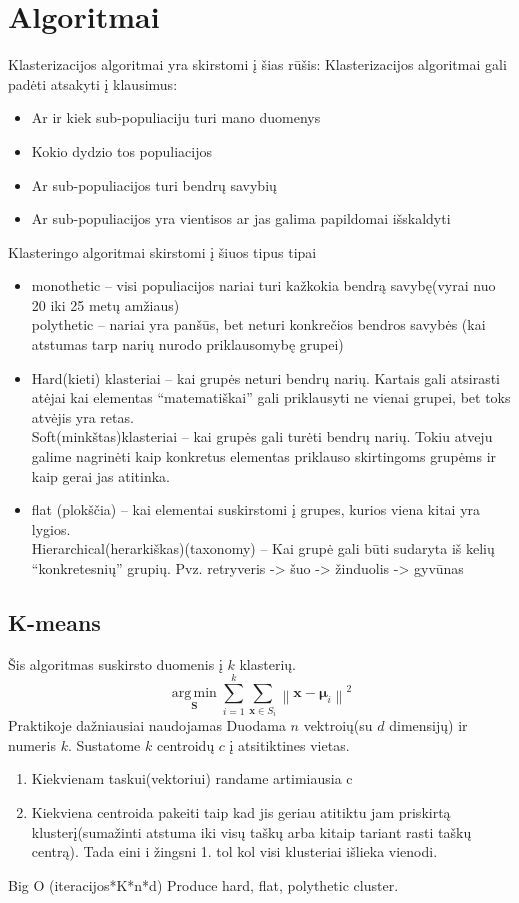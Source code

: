 \documentclass{VUMIFInfKursinis}
\begin{document}
\section{Algoritmai}
Klasterizacijos algoritmai yra skirstomi į šias rūšis:
Klasterizacijos algoritmai gali padėti atsakyti į klausimus:
\begin{itemize}
	\item Ar ir kiek sub-populiaciju turi mano duomenys
	\item Kokio dydzio tos populiacijos
	\item Ar sub-populiacijos turi bendrų savybių
	\item Ar sub-populiacijos yra vientisos ar jas galima papildomai išskaldyti
\end{itemize}
Klasteringo algoritmai skirstomi į šiuos tipus tipai
\begin{itemize}
	\item monothetic – visi populiacijos nariai turi kažkokia bendrą savybę(vyrai nuo 20 iki 25 metų amžiaus)
\\polythetic – nariai yra panšūs, bet neturi konkrečios bendros savybės (kai atstumas tarp narių nurodo priklausomybę grupei)
	\item Hard(kieti) klasteriai – kai grupės neturi bendrų narių. Kartais gali atsirasti atėjai kai elementas “matematiškai” gali priklausyti ne vienai grupei, bet toks atvėjis yra retas.
\\Soft(minkštas)klasteriai – kai grupės gali turėti bendrų narių. Tokiu atveju galime nagrinėti kaip konkretus elementas priklauso skirtingoms grupėms ir kaip gerai jas atitinka.
	\item flat (plokščia) – kai elementai suskirstomi į grupes, kurios viena kitai yra lygios.
\\Hierarchical(herarkiškas)(taxonomy) – Kai grupė gali būti sudaryta iš kelių “konkretesnių” grupių. Pvz. retryveris -> šuo -> žinduolis -> gyvūnas
\end{itemize}
	\subsection{K-means}
Šis algoritmas suskirsto duomenis į $ k $ klasterių.
	\[ \underset{\mathbf{S}} {\operatorname{arg\,min}}  \sum_{i=1}^{k} \sum_{\mathbf x \in S_i} \left\| \mathbf x - \boldsymbol\mu_i \right\|^2 \]
	Praktikoje dažniausiai naudojamas
	Duodama $n$ vektroių(su $d$ dimensijų) ir numeris $k$.
Sustatome $k$ centroidų $c$ į atsitiktines vietas.
\begin{enumerate}
\item Kiekvienam taskui(vektoriui) randame artimiausia c
\item Kiekviena centroida pakeiti taip kad jis geriau atitiktu jam priskirtą klusterį(sumažinti atstuma iki visų taškų arba kitaip tariant rasti taškų centrą). Tada eini i žingsni  1. tol kol visi klusteriai išlieka vienodi.
\end{enumerate}
Big O (iteracijos*K*n*d)
Produce hard, flat, polythetic cluster. 
\end{document}
